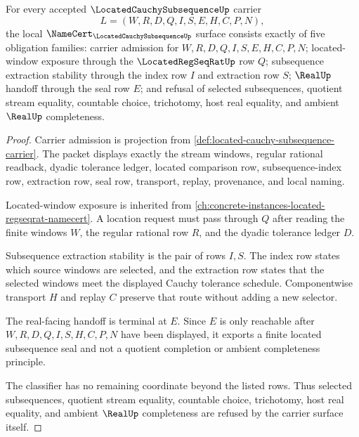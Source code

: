 \begin{theorem}
\label{thm:located-cauchy-subsequence-namecert-obligations}
For every accepted $\LocatedCauchySubsequenceUp$ carrier
$$
L=(W,R,D,Q,I,S,E,H,C,P,N),
$$
the local $\NameCert_{\LocatedCauchySubsequenceUp}$ surface consists exactly of five obligation families: carrier admission for $W,R,D,Q,I,S,E,H,C,P,N$; located-window exposure through the $\LocatedRegSeqRatUp$ row $Q$; subsequence extraction stability through the index row $I$ and extraction row $S$; $\RealUp$ handoff through the seal row $E$; and refusal of selected subsequences, quotient stream equality, countable choice, trichotomy, host real equality, and ambient $\RealUp$ completeness.
\end{theorem}
\begin{proof}
Carrier admission is projection from \autoref{def:located-cauchy-subsequence-carrier}. The packet displays exactly the stream windows, regular rational readback, dyadic tolerance ledger, located comparison row, subsequence-index row, extraction row, seal row, transport, replay, provenance, and local naming.

Located-window exposure is inherited from \autoref{ch:concrete-instances-located-regseqrat-namecert}. A location request must pass through $Q$ after reading the finite windows $W$, the regular rational row $R$, and the dyadic tolerance ledger $D$.

Subsequence extraction stability is the pair of rows $I,S$. The index row states which source windows are selected, and the extraction row states that the selected windows meet the displayed Cauchy tolerance schedule. Componentwise transport $H$ and replay $C$ preserve that route without adding a new selector.

The real-facing handoff is terminal at $E$. Since $E$ is only reachable after $W,R,D,Q,I,S,H,C,P,N$ have been displayed, it exports a finite located subsequence seal and not a quotient completion or ambient completeness principle.

The classifier has no remaining coordinate beyond the listed rows. Thus selected subsequences, quotient stream equality, countable choice, trichotomy, host real equality, and ambient $\RealUp$ completeness are refused by the carrier surface itself.
\end{proof}


